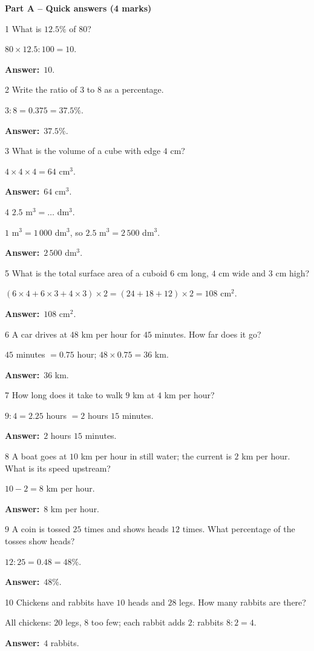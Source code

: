 \documentclass[11pt]{article}
\newif\ifsol \solfalse
\providecommand{\AnsWord}{Đáp số}
\newcommand{\dapso}[1]{\par\textbf{\AnsWord:}\ #1}
\newcommand{\probsol}[1]{%
  \begin{lrbox}{\solmeasure}\begin{minipage}{\dimexpr\linewidth-24pt\relax}#1\end{minipage}\end{lrbox}%
  \ifsol
    \begin{solbox}#1\end{solbox}%
  \else
    \setlength{\solht}{\dimexpr\ht\solmeasure+\dp\solmeasure+0.85cm\relax}%
    \ifdim\solht<1.35cm\setlength{\solht}{1.35cm}\fi
    \begin{tcolorbox}[colback=white,colframe=Line,boxrule=0.8pt,arc=5pt,
      left=8pt,right=8pt,top=4pt,bottom=4pt,height=\solht]{\footnotesize\color{Slate}\itshape\WorkWord}\end{tcolorbox}%
  \fi}
\newcommand{\dividerbar}[1]{\par\vspace{0.6em}\noindent
  \begin{tcolorbox}[enhanced,frame hidden,interior hidden,borderline west={5pt}{0pt}{ProbBlue},
    colback=white,left=12pt,right=12pt,top=5pt,bottom=5pt,arc=4pt]
  {\large\bfseries\color{ProbBlue} #1}\end{tcolorbox}\vspace{0.4em}}
\newcommand{\gap}{\vspace{0.3cm}}
\def\WorkWord{Your work:}
\def\AnsWord{Answer}
\begin{document}
\gap
\dividerbar{Part A -- Quick answers (4 marks)}
\begin{probbox}{1}{\relax}
What is $12.5\%$ of $80$?
\end{probbox}
\probsol{
$80\times12.5:100=10$.
\dapso{$10$.}}
\gap
\begin{probbox}{2}{\relax}
Write the ratio of $3$ to $8$ as a percentage.
\end{probbox}
\probsol{
$3:8=0.375=37.5\%$.
\dapso{$37.5\%$.}}
\gap
\begin{probbox}{3}{\relax}
What is the volume of a cube with edge $4$ cm?
\end{probbox}
\probsol{
$4\times4\times4=64$ cm$^3$.
\dapso{$64$ cm$^3$.}}
\gap
\begin{probbox}{4}{\relax}
$2.5$ m$^3=\ldots$ dm$^3$.
\end{probbox}
\probsol{
$1$ m$^3=1\,000$ dm$^3$, so $2.5$ m$^3=2\,500$ dm$^3$.
\dapso{$2\,500$ dm$^3$.}}
\gap
\begin{probbox}{5}{\relax}
What is the total surface area of a cuboid $6$ cm long, $4$ cm wide and $3$ cm high?
\end{probbox}
\probsol{
$(6\times4+6\times3+4\times3)\times2=(24+18+12)\times2=108$ cm$^2$.
\dapso{$108$ cm$^2$.}}
\gap
\begin{probbox}{6}{\relax}
A car drives at $48$ km per hour for $45$ minutes. How far does it go?
\end{probbox}
\probsol{
$45$ minutes $=0.75$ hour; $48\times0.75=36$ km.
\dapso{$36$ km.}}
\gap
\begin{probbox}{7}{\relax}
How long does it take to walk $9$ km at $4$ km per hour?
\end{probbox}
\probsol{
$9:4=2.25$ hours $=2$ hours $15$ minutes.
\dapso{$2$ hours $15$ minutes.}}
\gap
\begin{probbox}{8}{\relax}
A boat goes at $10$ km per hour in still water; the current is $2$ km per hour. What is its speed upstream?
\end{probbox}
\probsol{
$10-2=8$ km per hour.
\dapso{$8$ km per hour.}}
\gap
\begin{probbox}{9}{\relax}
A coin is tossed $25$ times and shows heads $12$ times. What percentage of the tosses show heads?
\end{probbox}
\probsol{
$12:25=0.48=48\%$.
\dapso{$48\%$.}}
\gap
\begin{probbox}{10}{\relax}
Chickens and rabbits have $10$ heads and $28$ legs. How many rabbits are there?
\end{probbox}
\probsol{
All chickens: $20$ legs, $8$ too few; each rabbit adds $2$: rabbits $8:2=4$.
\dapso{$4$ rabbits.}}
\end{document}

